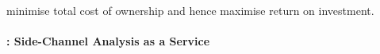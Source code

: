 %
%
%
%

 minimise total cost of ownership
and hence maximise return on investment.


\paragraph{\SCAAASID: Side-Channel Analysis as a Service}


